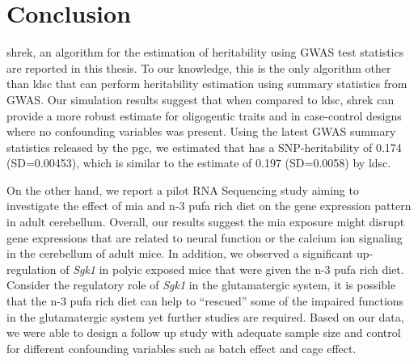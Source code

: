 \documentclass[12pt]{book}
\newcommand*{\glng}{\glsentrylong}
\begin{document}
	\chapter{Conclusion}
	\label{conclusionChapter}
	\glsresetall
	\gls{shrek}, an algorithm for the estimation of heritability using \gls{GWAS} test statistics are reported in this thesis.
	To our knowledge, this is the only algorithm other than \gls{ldsc} that can perform heritability estimation using summary statistics from \gls{GWAS}.
	Our simulation results suggest that when compared to \gls{ldsc}, \gls{shrek} can provide a more robust estimate for oligogentic traits and in case-control designs where no confounding variables was present. 
	Using the latest \gls{GWAS} summary statistics released by the \gls{pgc}, we estimated that \glng{scz} has a \gls{SNP}-heritability of 0.174 (SD=0.00453), which is similar to the estimate of 0.197 (SD=0.0058) by \gls{ldsc}.
	
	On the other hand, we report a pilot RNA Sequencing study aiming to investigate the effect of \acrfull{mia} and n-3 \gls{pufa} rich diet on the gene expression pattern in adult cerebellum. 
	Overall, our results suggest the \gls{mia} exposure might disrupt gene expressions that are related to neural function or the calcium ion signaling in the cerebellum of adult mice. 
	In addition, we observed a significant up-regulation of \textit{Sgk1} in \gls{polyic} exposed mice that were given the n-3 \gls{pufa} rich diet. 
	Consider the regulatory role of \textit{Sgk1} in the glutamatergic system, it is possible that the n-3 \gls{pufa} rich diet can help to ``rescued'' some of the impaired functions in the glutamatergic system yet further studies are required.
	Based on our data, we were able to design a follow up study with adequate sample size and control for different confounding variables such as batch effect and cage effect. 
	
\end{document}
